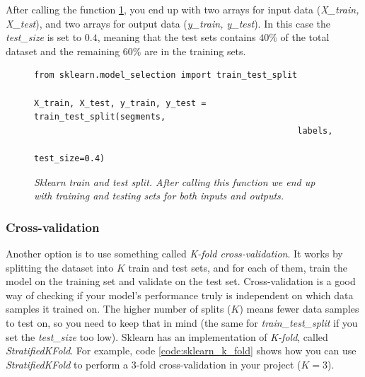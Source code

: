 After calling the function \ref{code:sklearn_train_test_split}, you end up with two arrays for input data (\textit{X\_train, X\_test}), and two arrays for output data (\textit{y\_train, y\_test}). In this case the \textit{test\_size} is set to $0.4$, meaning that the test sets contains $40\%$ of the total dataset and the remaining $60\%$ are in the training sets.

\begin{figure}
\begin{code}
    \begin{verbatim}
from sklearn.model_selection import train_test_split

X_train, X_test, y_train, y_test = train_test_split(segments, 
                                                    labels, 
                                                    test_size=0.4)
    \end{verbatim}
    \caption{\textit{Sklearn train and test split. After calling this function we end up with training and testing sets for both inputs and outputs.}}
    \label{code:sklearn_train_test_split}
\end{code}
\end{figure}

\subsubsection{Cross-validation}
Another option is to use something called \textit{K-fold cross-validation}. It works by splitting the dataset into $K$ train and test sets, and for each of them, train the model on the training set and validate on the test set. Cross-validation is a good way of checking if your model's performance truly is independent on which data samples it trained on. The higher number of splits ($K$) means fewer data samples to test on, so you need to keep that in mind (the same for \textit{train\_test\_split} if you set the \textit{test\_size} too low). Sklearn has an implementation of \textit{K-fold}, called \textit{StratifiedKFold}. For example, code \ref{code:sklearn_k_fold} shows how you can use \textit{StratifiedKFold} to perform a 3-fold cross-validation in your project ($K = 3$). 

\newpage

